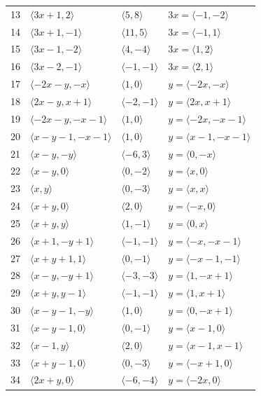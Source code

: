 \documentclass[11pt]{article}
\begin{document}
\begin{longtable}{@{}rlll@{}}
13 & $\langle 3x+1,2\rangle$ & $\langle 5,8\rangle$ & $3x=\langle -1,-2\rangle$\\
14 & $\langle 3x+1,-1\rangle$ & $\langle 11,5\rangle$ & $3x=\langle -1,1\rangle$\\
15 & $\langle 3x-1,-2\rangle$ & $\langle 4,-4\rangle$ & $3x=\langle 1,2\rangle$\\
16 & $\langle 3x-2,-1\rangle$ & $\langle -1,-1\rangle$ & $3x=\langle 2,1\rangle$\\
17 & $\langle -2x-y,-x\rangle$ & $\langle 1,0\rangle$ & $y=\langle -2x,-x\rangle$\\
18 & $\langle 2x-y,x+1\rangle$ & $\langle -2,-1\rangle$ & $y=\langle 2x,x+1\rangle$\\
19 & $\langle -2x-y,-x-1\rangle$ & $\langle 1,0\rangle$ & $y=\langle -2x,-x-1\rangle$\\
20 & $\langle x-y-1,-x-1\rangle$ & $\langle 1,0\rangle$ & $y=\langle x-1,-x-1\rangle$\\
21 & $\langle x-y,-y\rangle$ & $\langle -6,3\rangle$ & $y=\langle 0,-x\rangle$\\
22 & $\langle x-y,0\rangle$ & $\langle 0,-2\rangle$ & $y=\langle x,0\rangle$\\
23 & $\langle x,y\rangle$ & $\langle 0,-3\rangle$ & $y=\langle x,x\rangle$\\
24 & $\langle x+y,0\rangle$ & $\langle 2,0\rangle$ & $y=\langle -x,0\rangle$\\
25 & $\langle x+y,y\rangle$ & $\langle 1,-1\rangle$ & $y=\langle 0,x\rangle$\\
26 & $\langle x+1,-y+1\rangle$ & $\langle -1,-1\rangle$ & $y=\langle -x,-x-1\rangle$\\
27 & $\langle x+y+1,1\rangle$ & $\langle 0,-1\rangle$ & $y=\langle -x-1,-1\rangle$\\
28 & $\langle x-y,-y+1\rangle$ & $\langle -3,-3\rangle$ & $y=\langle 1,-x+1\rangle$\\
29 & $\langle x+y,y-1\rangle$ & $\langle -1,-1\rangle$ & $y=\langle 1,x+1\rangle$\\
30 & $\langle x-y-1,-y\rangle$ & $\langle 1,0\rangle$ & $y=\langle 0,-x+1\rangle$\\
31 & $\langle x-y-1,0\rangle$ & $\langle 0,-1\rangle$ & $y=\langle x-1,0\rangle$\\
32 & $\langle x-1,y\rangle$ & $\langle 2,0\rangle$ & $y=\langle x-1,x-1\rangle$\\
33 & $\langle x+y-1,0\rangle$ & $\langle 0,-3\rangle$ & $y=\langle -x+1,0\rangle$\\
34 & $\langle 2x+y,0\rangle$ & $\langle -6,-4\rangle$ & $y=\langle -2x,0\rangle$\\

\end{longtable}
\end{document}
